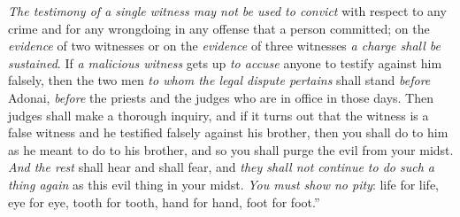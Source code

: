 \begin{biblechapter}
\verse \textit{The testimony of a single witness may not be used to convict} with respect to any crime and for any wrongdoing in any offense that a person committed; on the \textit{evidence} of two witnesses or on the \textit{evidence} of three witnesses \textit{a charge shall be sustained}.
\verse If \textit{a malicious witness} gets up \textit{to accuse} anyone to testify against him falsely,
\verse then the two men \textit{to whom the legal dispute pertains} shall stand \textit{before} Adonai, \textit{before} the priests and the judges who are in office in those days.
\verse Then judges shall make a thorough inquiry, and if it turns out that the witness is a false witness and he testified falsely against his brother,
\verse then you shall do to him as he meant to do to his brother, and so you shall purge the evil from your midst.
\verse \textit{And the rest} shall hear and shall fear, and \textit{they shall not continue to do such a thing again} as this evil thing in your midst.
\verse \textit{You must show no pity}: life for life, eye for eye, tooth for tooth, hand for hand, foot for foot.”
\end{biblechapter}

